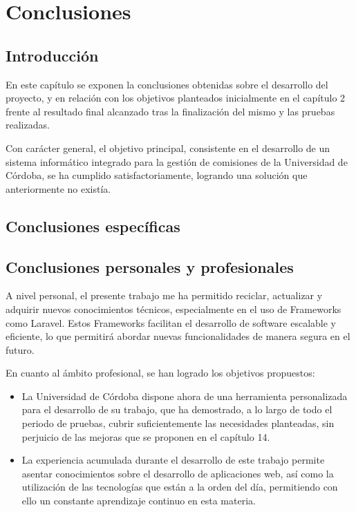 \chapter{Conclusiones}

\section{Introducción}
En este capítulo se exponen la conclusiones obtenidas sobre el desarrollo del proyecto, y en relación con los objetivos planteados inicialmente en el capítulo 2 frente al resultado final alcanzado tras la finalización del mismo y las pruebas realizadas. 

Con carácter general, el objetivo principal, consistente en el desarrollo de un sistema informático integrado para la gestión de comisiones de la Universidad de Córdoba, se ha cumplido satisfactoriamente, logrando una solución que anteriormente no existía.

\section{Conclusiones específicas}

\section{Conclusiones personales y profesionales}
A nivel personal, el presente trabajo me ha permitido reciclar, actualizar y adquirir nuevos conocimientos técnicos, especialmente en el uso de Frameworks como Laravel. Estos Frameworks facilitan el desarrollo de software escalable y eficiente, lo que permitirá abordar nuevas funcionalidades de manera segura en el futuro.

En cuanto al ámbito profesional, se han logrado los objetivos propuestos:

\begin{itemize}

\item La Universidad de Córdoba dispone ahora de una herramienta personalizada para el desarrollo de su trabajo, que ha demostrado, a lo largo de todo el periodo de pruebas, cubrir suficientemente las necesidades planteadas, sin perjuicio de las mejoras que se proponen en el capítulo 14.

\item La experiencia acumulada durante el desarrollo de este trabajo permite asentar conocimientos sobre el desarrollo de aplicaciones web, así como la utilización de las tecnologías que están a la orden del día, permitiendo con ello un constante aprendizaje continuo en esta materia. 

\end{itemize}


